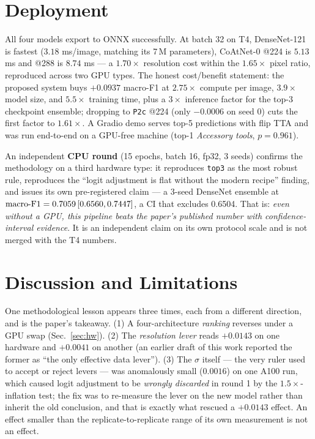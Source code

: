 \documentclass[11pt,a4paper]{article}
\newcommand{\macroF}{\textup{macro-F1}}   %
\begin{document}
\section{Deployment}
\label{sec:deploy}
All four models export to ONNX successfully. At batch 32 on T4, DenseNet-121 is
fastest ($3.18$ ms/image, matching its 7\,M parameters), CoAtNet-0 @224 is
$5.13$ ms and @288 is $8.74$ ms --- a $1.70\times$ resolution cost within the
$1.65\times$ pixel ratio, reproduced across two GPU types. The honest
cost/benefit statement: the proposed system buys $+0.0937$ \macroF{} at
$2.75\times$ compute per image, $3.9\times$ model size, and $5.5\times$ training
time, plus a $3\times$ inference factor for the top-3 checkpoint ensemble;
dropping to \texttt{P2c} @224 (only $-0.0006$ on seed 0) cuts the first factor
to $1.61\times$. A Gradio demo serves top-5 predictions with flip TTA and was
run end-to-end on a GPU-free machine (top-1 \emph{Accessory tools}, $p=0.961$).

An independent \textbf{CPU round} (15 epochs, batch 16, fp32, 3 seeds) confirms
the methodology on a third hardware type: it reproduces \texttt{top3} as the most
robust rule, reproduces the ``logit adjustment is flat without the modern
recipe'' finding, and issues its own pre-registered claim --- a 3-seed DenseNet
ensemble at $\macroF{}=0.7059\,[0.6560,0.7447]$, a CI that excludes 0.6504.
That is: \emph{even without a GPU, this pipeline beats the paper's published
number with confidence-interval evidence}. It is an independent claim on its own
protocol scale and is not merged with the T4 numbers.

\section{Discussion and Limitations}
\label{sec:discussion}
One methodological lesson appears three times, each from a different direction,
and is the paper's takeaway. (1) A four-architecture \emph{ranking} reverses
under a GPU swap (Sec.~\ref{sec:hw}). (2) The \emph{resolution lever} reads
$+0.0143$ on one hardware and $+0.0041$ on another (an earlier draft of this work
reported the former as ``the only effective data lever''). (3) The $\sigma$
itself --- the very ruler used to accept or reject levers --- was anomalously
small ($0.0016$) on one A100 run, which caused logit adjustment to be
\emph{wrongly discarded} in round 1 by the $1.5\times$-inflation test; the fix
was to re-measure the lever on the new model rather than inherit the old
conclusion, and that is exactly what rescued a $+0.0143$ effect. An effect
smaller than the replicate-to-replicate range of its own measurement is not an
effect.
\end{document}
